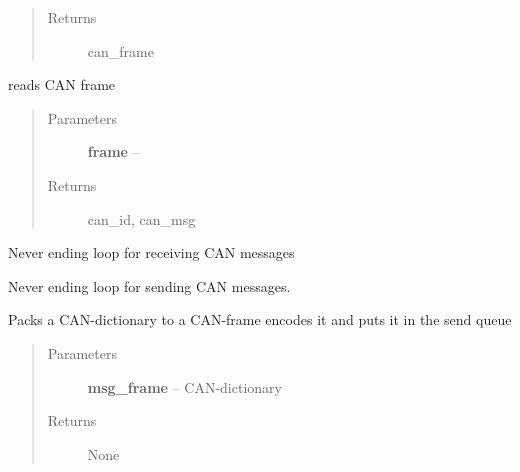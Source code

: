 \documentclass[letterpaper,10pt,english]{sphinxmanual}
\begin{document}
\begin{fulllineitems}
\begin{fulllineitems}
\begin{quote}
\begin{description}
\item[{Returns}] \leavevmode
can\_frame

\end{description}\end{quote}

\end{fulllineitems}


\begin{fulllineitems}
\label{libraries:libraries.can.Can._dissect_can_frame}
reads CAN frame
\begin{quote}\begin{description}
\item[{Parameters}] \leavevmode
\textbf{frame} -- 

\item[{Returns}] \leavevmode
can\_id, can\_msg

\end{description}\end{quote}

\end{fulllineitems}


\begin{fulllineitems}
\label{libraries:libraries.can.Can._recv_connection}
Never ending loop for receiving CAN messages

\end{fulllineitems}


\begin{fulllineitems}
\label{libraries:libraries.can.Can._send_connection}
Never ending loop for sending CAN messages.

\end{fulllineitems}


\begin{fulllineitems}
\label{libraries:libraries.can.Can.send}
Packs a CAN-dictionary to a CAN-frame encodes it and puts it in the send queue
\begin{quote}\begin{description}
\item[{Parameters}] \leavevmode
\textbf{msg\_frame} -- CAN-dictionary

\item[{Returns}] \leavevmode
None

\end{description}\end{quote}

\end{fulllineitems}


\end{fulllineitems}
\end{document}
